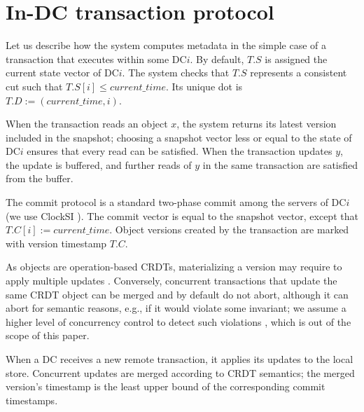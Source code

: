 \section{In-DC transaction protocol}
\label{sec:dc-transaction-protocol}

Let us describe how the system computes metadata in the simple case
of a transaction that executes within some DC$i$.
By default, $T.S$ is assigned the current state vector of DC$i$.
The system checks that $T.S$ represents a consistent cut
\cite{rep:pro:sh182, rep:syn:sh156} such that $T.S[i] \le
\mathit{current\_time}$.
Its unique dot is $T.D := (\mathit{current\_time}, i)$.

When the transaction reads an object $x$, the system returns its
latest version included in the snapshot; choosing a snapshot vector
less or equal to the state of DC$i$ ensures that every read can be
satisfied. When the transaction updates $y$, the update is buffered,
and further reads of $y$ in the same transaction are satisfied from
the buffer.

The commit protocol is a standard two-phase commit among the
servers of DC$i$ (we use ClockSI \cite{rep:pan:1723}).
The commit vector is equal to the snapshot vector,
except that $T.C[i] := \mathit{current\_time}$.
Object versions created by the transaction are marked with version
timestamp $T.C$.

As \system{} objects are operation-based CRDTs, materializing a version
may require to apply multiple updates \cite{syn:rep:sh143,
  app:rep:1716}.
Conversely, concurrent transactions that update the same CRDT object can
be merged and by default do not abort, although it can abort for
semantic reasons, e.g., if it would violate some invariant; we assume a
higher level of concurrency control to detect such violations
\cite{syn:app:sh179, syn:rep:lan:1815, rep:syn:lan:1646}, which is out
of the scope of this paper.

When a DC receives a new remote transaction, it applies its updates to
the local store. Concurrent updates are merged according to CRDT
semantics; the merged version's timestamp is the least upper bound of
the corresponding commit timestamps.

